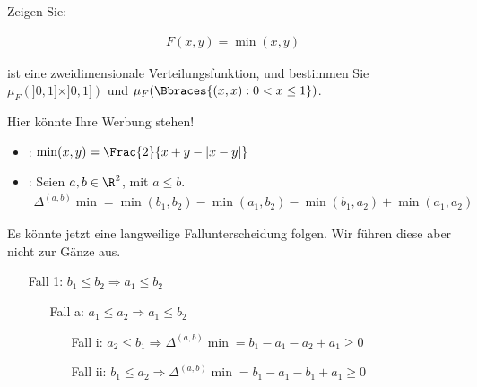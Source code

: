 \begin{exercise}

Zeigen Sie:

\begin{align*}
  F(x, y) = \min(x, y)
\end{align*}

ist eine zweidimensionale Verteilungsfunktion, und bestimmen Sie $\mu_F(]0, 1] \times ]0, 1])$ und $\mu_F(\Bbraces{(x, x) : 0 < x \leq 1})$.

\end{exercise}


\begin{solution}

Hier könnte Ihre Werbung stehen!

\begin{itemize}

  \item {}: $\min(x, y) = \Frac{2}{x + y - |x - y|}$

  \item {}: Seien $a, b \in \R^2$, mit $a \leq b$.
  \begin{align*}
    \Delta^{(a, b)} \min
    =
    \min(b_1, b_2) - \min(a_1, b_2) - \min(b_1, a_2) + \min(a_1, a_2)
  \end{align*}

\end{itemize}

Es könnte jetzt eine langweilige Fallunterscheidung folgen. Wir führen diese aber nicht zur Gänze aus.

\begin{itemize}
  \item[Fall 1:] $b_1 \leq b_2 \Rightarrow a_1 \leq b_2$
  \begin{itemize}
    \item[Fall a:] $a_1 \leq a_2 \Rightarrow a_1 \leq b_2$
    \begin{itemize}
      \item[Fall i:] $a_2 \leq b_1 \Rightarrow
      \Delta^{(a, b)} \min = b_1 - a_1 - a_2 + a_1 \geq 0$
      \item[Fall ii:] $b_1 \leq a_2 \Rightarrow
      \Delta^{(a, b)} \min = b_1 - a_1 - b_1 + a_1 \geq 0$
    \end{itemize}
  \end{itemize}
\end{itemize}


\end{solution}
